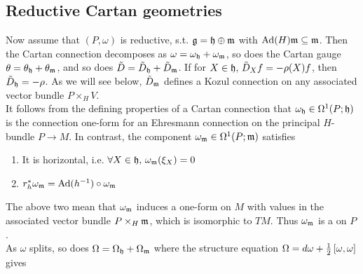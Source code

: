 \documentclass{article}
\begin{document}
\subsection{Reductive Cartan geometries}

Now assume that $(P,\omega)$ is reductive, s.t. $\mathfrak{g} = \mathfrak{h} \oplus \mathfrak{m}$ with $\operatorname{Ad}(H)\mathfrak{m} \subseteq \mathfrak{m}$. Then the Cartan connection decomposes as $\omega = \omega_{\mathfrak{h}} + \omega_{\mathfrak{m}}$, so does the Cartan gauge $\theta = \theta_{\mathfrak{h}}+ \theta_{\mathfrak{m}}$, and so does $\tilde{D} = \tilde{D}_{\mathfrak{h}} + \tilde{D}_{\mathfrak{m}}$. If for $X \in \mathfrak{h}, \, \tilde{D}_X f = - \rho(X) f$, then $\tilde{D}_{\mathfrak{h}} = -\rho$. As we will see below, $\tilde{D}_{\mathfrak{m}}$ defines a Kozul connection on any associated vector bundle $P \times_H V$. \\
It follows from the defining properties of a Cartan connection that $\omega_{\mathfrak{h}} \in \Omega^1(P;\mathfrak{h})$ is the connection one-form for an Ehresmann connection on the principal $H$-bundle $P \to M$. In contrast, the component $\omega_{\mathfrak{m}} \in \Omega^1(P;\mathfrak{m})$ satisfies 
\begin{enumerate}
    \item It is horizontal, i.e. $\forall X \in \mathfrak{h}, \, \omega_{\mathfrak{m}}(\xi_X) = 0$
    \item $r_h^\ast \omega_{\mathfrak{m}} = \operatorname{Ad}(h^{-1}) \circ \omega_{\mathfrak{m}}$
\end{enumerate}
The above two mean that $\omega_{\mathfrak{m}}$ induces a one-form on $M$ with values in the associated vector bundle $P \times_H \mathfrak{m}$, which is isomorphic to $TM$. Thus $\omega_{\mathfrak{m}}$ is a  on $P$. \\
As $\omega$ splits, so does $\Omega = \Omega_{\mathfrak{h}} + \Omega_{\mathfrak{m}}$ where the structure equation $\Omega = d\omega + \frac{1}{2}\left[ \omega, \omega \right]$ gives 
\end{document}
